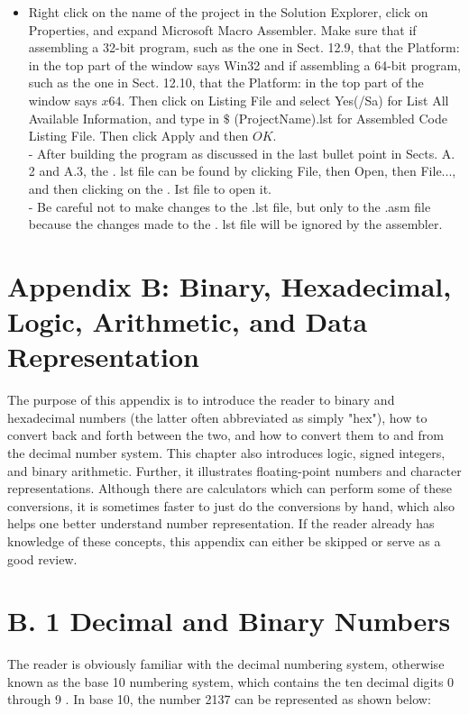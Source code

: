 \documentclass[10pt]{book}
\begin{document}
\begin{itemize}
  \item Right click on the name of the project in the Solution Explorer, click on Properties, and expand Microsoft Macro Assembler. Make sure that if assembling a 32-bit program, such as the one in Sect. 12.9, that the Platform: in the top part of the window says Win32 and if assembling a 64-bit program, such as the one in Sect. 12.10, that the Platform: in the top part of the window says $x 64$. Then click on Listing File and select Yes(/Sa) for List All Available Information, and type in $\$$ (ProjectName).lst for Assembled Code Listing File. Then click Apply and then $O K$.\\
- After building the program as discussed in the last bullet point in Sects. A. 2 and A.3, the . lst file can be found by clicking File, then Open, then File..., and then clicking on the . Ist file to open it.\\
- Be careful not to make changes to the .lst file, but only to the .asm file because the changes made to the . lst file will be ignored by the assembler.
\end{itemize}

\section{Appendix B: Binary, Hexadecimal, Logic, Arithmetic, and Data Representation}
The purpose of this appendix is to introduce the reader to binary and hexadecimal numbers (the latter often abbreviated as simply "hex"), how to convert back and forth between the two, and how to convert them to and from the decimal number system. This chapter also introduces logic, signed integers, and binary arithmetic. Further, it illustrates floating-point numbers and character representations. Although there are calculators which can perform some of these conversions, it is sometimes faster to just do the conversions by hand, which also helps one better understand number representation. If the reader already has knowledge of these concepts, this appendix can either be skipped or serve as a good review.

\section{B. 1 Decimal and Binary Numbers}
The reader is obviously familiar with the decimal numbering system, otherwise known as the base 10 numbering system, which contains the ten decimal digits 0 through 9 . In base 10, the number 2137 can be represented as shown below:
\end{document}
